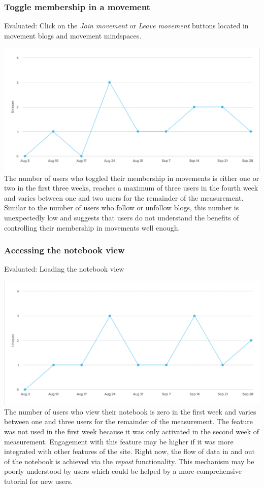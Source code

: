 \subsubsection{Toggle membership in a
movement}\label{toggle-membership-in-a-movement}

Evaluated: Click on the \emph{Join movement} or \emph{Leave movement}
buttons located in movement blogs and movement mindspaces.

\includegraphics{img/eval_membership.png}\\
 The number of users who toggled their membership in movements is either
one or two in the first three weeks, reaches a maximum of three users in
the fourth week and varies between one and two users for the remainder
of the measurement. Similar to the number of users who follow or
unfollow blogs, this number is unexpectedly low and suggests that users
do not understand the benefits of controlling their membership in
movements well enough.

\subsubsection{Accessing the notebook
view}\label{accessing-the-notebook-view}

Evaluated: Loading the notebook view

\includegraphics{img/eval_notebook.png}\\
 The number of users who view their notebook is zero in the first week
and varies between one and three users for the remainder of the
measurement. The feature was not used in the first week because it was
only activated in the second week of measurement. Engagement with this
feature may be higher if it was more integrated with other features of
the site. Right now, the flow of data in and out of the notebook is
achieved via the \emph{repost} functionality. This mechanism may be
poorly understood by users which could be helped by a more comprehensive
tutorial for new users.

